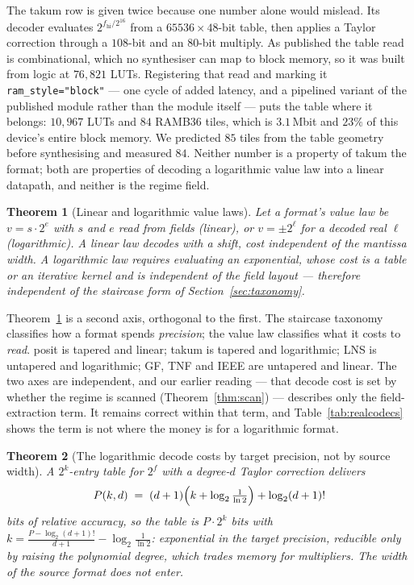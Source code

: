 \documentclass[11pt]{article}
\newtheorem{theorem}{Theorem}
\theoremstyle{definition}
\begin{document}
The takum row is given twice because one number alone would mislead. Its decoder
evaluates $2^{f_{\mathrm{hi}}/2^{16}}$ from a $65536 \times 48$-bit table, then
applies a Taylor correction through a $108$-bit and an $80$-bit multiply. As
published the table read is combinational, which no synthesiser can map to block
memory, so it was built from logic at $76{,}821$ LUTs. Registering that read and
marking it \texttt{ram\_style="block"} --- one cycle of added latency, and a
pipelined variant of the published module rather than the module itself --- puts
the table where it belongs: $10{,}967$ LUTs and $84$ RAMB36 tiles, which is
$3.1$\,Mbit and $23\%$ of this device's entire block memory. We predicted $85$
tiles from the table geometry before synthesising and measured $84$. Neither
number is a property of takum the format; both are properties of decoding a
logarithmic value law into a linear datapath, and neither is the regime field.

\begin{theorem}[Linear and logarithmic value laws]
\label{thm:valuelaw}
Let a format's value law be $v = s \cdot 2^{e}$ with $s$ and $e$ read from fields
(\emph{linear}), or $v = \pm 2^{\ell}$ for a decoded real $\ell$
(\emph{logarithmic}). A linear law decodes with a shift, cost independent of the
mantissa width. A logarithmic law requires evaluating an exponential, whose cost
is a table or an iterative kernel and is independent of the field layout ---
therefore independent of the staircase form of Section~\ref{sec:taxonomy}.
\end{theorem}

Theorem~\ref{thm:valuelaw} is a second axis, orthogonal to the first. The
staircase taxonomy classifies how a format spends \emph{precision}; the value law
classifies what it costs to \emph{read}. posit is tapered and linear; takum is
tapered and logarithmic; LNS is untapered and logarithmic; GF, TNF and IEEE are
untapered and linear. The two axes are independent, and our earlier reading ---
that decode cost is set by whether the regime is scanned
(Theorem~\ref{thm:scan}) --- describes only the field-extraction term. It remains
correct within that term, and Table~\ref{tab:realcodecs} shows the term is not
where the money is for a logarithmic format.


\begin{theorem}[The logarithmic decode costs by target precision, not by source width]
\label{thm:targetprec}
A $2^{k}$-entry table for $2^{f}$ with a degree-$d$ Taylor correction delivers
\[
P(k,d) \;=\; (d+1)\Bigl(k + \log_2\tfrac{1}{\ln 2}\Bigr) + \log_2 (d+1)!
\]
bits of relative accuracy, so the table is $P \cdot 2^{k}$ bits with
$k = \frac{P - \log_2 (d+1)!}{d+1} - \log_2\frac{1}{\ln 2}$: exponential in the
target precision, reducible only by raising the polynomial degree, which trades
memory for multipliers. The width of the source format does not enter.
\end{theorem}
\end{document}
